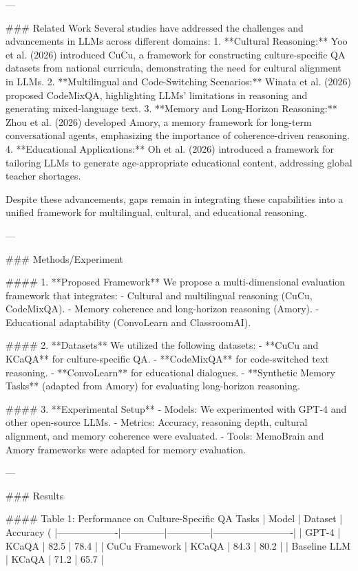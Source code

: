 ---

### Related Work
Several studies have addressed the challenges and advancements in LLMs across different domains:
1. **Cultural Reasoning:** Yoo et al. (2026) introduced CuCu, a framework for constructing culture-specific QA datasets from national curricula, demonstrating the need for cultural alignment in LLMs.
2. **Multilingual and Code-Switching Scenarios:** Winata et al. (2026) proposed CodeMixQA, highlighting LLMs' limitations in reasoning and generating mixed-language text.
3. **Memory and Long-Horizon Reasoning:** Zhou et al. (2026) developed Amory, a memory framework for long-term conversational agents, emphasizing the importance of coherence-driven reasoning.
4. **Educational Applications:** Oh et al. (2026) introduced a framework for tailoring LLMs to generate age-appropriate educational content, addressing global teacher shortages.

Despite these advancements, gaps remain in integrating these capabilities into a unified framework for multilingual, cultural, and educational reasoning.

---

### Methods/Experiment

#### 1. **Proposed Framework**
We propose a multi-dimensional evaluation framework that integrates:
   - Cultural and multilingual reasoning (CuCu, CodeMixQA).
   - Memory coherence and long-horizon reasoning (Amory).
   - Educational adaptability (ConvoLearn and ClassroomAI).

#### 2. **Datasets**
We utilized the following datasets:
   - **CuCu and KCaQA** for culture-specific QA.
   - **CodeMixQA** for code-switched text reasoning.
   - **ConvoLearn** for educational dialogues.
   - **Synthetic Memory Tasks** (adapted from Amory) for evaluating long-horizon reasoning.

#### 3. **Experimental Setup**
   - Models: We experimented with GPT-4 and other open-source LLMs.
   - Metrics: Accuracy, reasoning depth, cultural alignment, and memory coherence were evaluated.
   - Tools: MemoBrain and Amory frameworks were adapted for memory evaluation.

---

### Results

#### Table 1: Performance on Culture-Specific QA Tasks
| Model            | Dataset      | Accuracy (%
|-------------------|--------------|--------------|-------------------------|
| GPT-4            | KCaQA        | 82.5         | 78.4                   |
| CuCu Framework   | KCaQA        | 84.3         | 80.2                   |
| Baseline LLM      | KCaQA        | 71.2         | 65.7                   |

